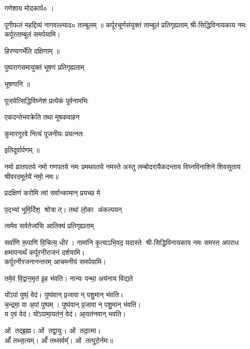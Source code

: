 \begin{center}
   गणेशाय   मोदकार्प० ।

    पूगीफलं महद्दिव्यं नागवल्ल्याद० ताम्बूलम् ॥ 
    {कर्पूरचूर्णसंयुक्तं ताम्बूलं प्रतिगृह्यताम्}
    श्री-सिद्धिविनायकाय नमः कर्पूरताम्बूलं समर्पयामि।\medskip
      

हिरण्यगर्भेति दक्षिणाम् ॥ 

{पुष्परागसमायुक्तं भूषणं प्रतिगृह्यताम्} 

भूषणानि ॥

{पूजयेत्सिद्धिविघ्नेशं प्रत्येकं पूर्वनामभिः} 

{एकदन्तेभवक्रेति तथा मूषकवाहन}

{कुमारगुरवे नित्यं पूजनीयः प्रयत्नतः}

इतिदूर्वार्पणम् ॥

नमो व्रातपतये नमो गणपतये नमः प्रमथपतये नमस्ते अस्तु लम्बोदरायैकदन्ताय विघ्नविनाशिने शिवसुताय श्रीवरदमू‍र्तये॑ नमो॒ नमः॥

{प्रदक्षिणं करोमि त्वां सर्वान्कामान् प्रयच्छ मे}

{प॒द्भ्यां भूमि॒र्दिश॒ श्रोत्रात्। तथा॑ लो॒का अ॑कल्पयन्}

{त्वमेव सर्वतेजांसि आतिक्यं प्रतिगृह्यताम्} 

{सर्वा॑णि रू॒पाणि॑ वि॒चित्य॒ धीर॑। नामा॑नि कृ॒त्वाऽभि॒वद॒\an{} यदास्ते}
श्री-सिद्धिविनायकाय नमः समस्त अपराध क्षमापनार्थं कर्पूरनीराजनं दर्शयामि।\\
कर्पूरनीरजनानन्तरम् आचमनीयं समर्पयामि।\medskip

{तमे॒वं वि॒द्वान॒मृत॑ इ॒ह भ॑वति। नान्यः पन्था॒ अय॑नाय विद्यते}

यो॑ऽपां पुष्पं॒ वेद॑। पुष्प॑वान् प्र॒जावान् पशु॒मान् भ॑वति।\\
च॒न्द्रमा॒ वा अ॒पां पुष्पम्। पुष्प॑वान् प्र॒जावान् पशु॒मान् भ॑वति।\\
य ए॒वं वेद॑। यो॑ऽपामा॒यत॑नं॒ वेद॑। आ॒यत॑नवान् भवति।\medskip

ओं तद्ब्र॒ह्म। ओं तद्वा॒युः। ओं तदा॒त्मा।\\ ओं᳚ तथ्स॒त्यम्‌।
ओं᳚ तथ्सर्वम्᳚‌। ओं तत्पुरो॒र्नमः॥\medskip


\end{center}
